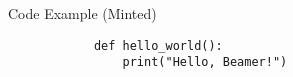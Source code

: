 \documentclass{beamer}
\begin{document}
    \begin{frame}[fragile]{Code Example (Minted)}
        \begin{verbatim}
            def hello_world():
                print("Hello, Beamer!")
        \end{verbatim}
    \end{frame}

    
\end{document}
